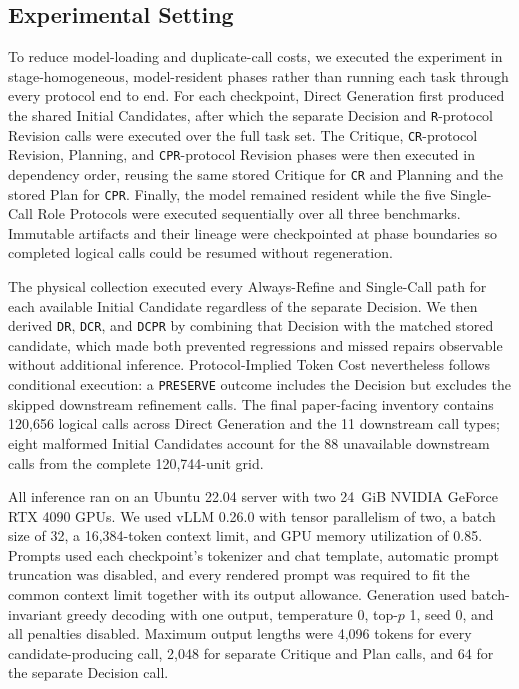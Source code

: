 \subsection{Experimental Setting}

To reduce model-loading and duplicate-call costs, we executed the experiment in stage-homogeneous, model-resident phases rather than running each task through every protocol end to end.
For each checkpoint, Direct Generation first produced the shared Initial Candidates, after which the separate Decision and \texttt{R}-protocol Revision calls were executed over the full task set.
The Critique, \texttt{CR}-protocol Revision, Planning, and \texttt{CPR}-protocol Revision phases were then executed in dependency order, reusing the same stored Critique for \texttt{CR} and Planning and the stored Plan for \texttt{CPR}.
Finally, the model remained resident while the five Single-Call Role Protocols were executed sequentially over all three benchmarks.
Immutable artifacts and their lineage were checkpointed at phase boundaries so completed logical calls could be resumed without regeneration.

The physical collection executed every Always-Refine and Single-Call path for each available Initial Candidate regardless of the separate Decision.
We then derived \texttt{DR}, \texttt{DCR}, and \texttt{DCPR} by combining that Decision with the matched stored candidate, which made both prevented regressions and missed repairs observable without additional inference.
Protocol-Implied Token Cost nevertheless follows conditional execution: a \texttt{PRESERVE} outcome includes the Decision but excludes the skipped downstream refinement calls.
The final paper-facing inventory contains 120,656 logical calls across Direct Generation and the 11 downstream call types; eight malformed Initial Candidates account for the 88 unavailable downstream calls from the complete 120,744-unit grid.

All inference ran on an Ubuntu 22.04 server with two 24~GiB NVIDIA GeForce RTX 4090 GPUs.
We used vLLM 0.26.0 with tensor parallelism of two, a batch size of 32, a 16,384-token context limit, and GPU memory utilization of 0.85.
Prompts used each checkpoint's tokenizer and chat template, automatic prompt truncation was disabled, and every rendered prompt was required to fit the common context limit together with its output allowance.
Generation used batch-invariant greedy decoding with one output, temperature 0, top-$p$ 1, seed 0, and all penalties disabled.
Maximum output lengths were 4,096 tokens for every candidate-producing call, 2,048 for separate Critique and Plan calls, and 64 for the separate Decision call.

